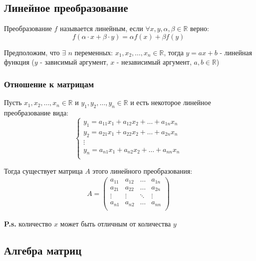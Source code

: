 \documentclass[class=article,a4paper,12pt,crop=false]{standalone}
\begin{document}
\subsection{Линейное преобразование}

Преобразование $f$ называется линейным, если $\forall x, y, \alpha, \beta \in \mathbb{R}$ верно:
\begin{equation}
    f(\alpha\cdot x + \beta\cdot y) = \alpha f(x) + \beta f(y)
\end{equation}

Предположим, что $\exists$ $n$ переменных: $x_1, x_2, \dots, x_n \in \mathbb{R}$, тогда
$y = ax + b$ - линейная функция ($y$ - зависимый аргумент,  $x$ - независимый аргумент,
$a, b \in \mathbb{R}$)

\subsubsection{Отношение к матрицам}

Пусть $x_1, x_2, \dots, x_n \in \mathbb{R}$ и $y_1, y_2, \dots, y_n \in \mathbb{R}$ и есть некоторое
линейное преобразование вида:
\begin{equation}
    \begin{cases}
        y_1 = a_{11}x_1 + a_{12}x_2 + \dots + a_{1n}x_n\\
        y_2 = a_{21}x_1 + a_{22}x_2 + \dots + a_{2n}x_n\\
        \vdots \\
        y_n = a_{n1}x_1 + a_{n2}x_2 + \dots + a_{nn}x_n\\
    \end{cases}
\end{equation}

Тогда существует матрица $A$ этого линейного преобразования:
\begin{eqnarray}
    A = \begin{pmatrix}
        a_{11} & a_{12} & \dots & a_{1n} \\
        a_{21} & a_{22} & \dots & a_{2n} \\
        \vdots & \vdots & \ddots & \vdots \\
        a_{n1} & a_{n2} & \dots & a_{nn} \\
    \end{pmatrix}
\end{eqnarray}

\textbf{P.s.} количество $x$ может быть отличным от количества $y$

\subsection{Алгебра матриц}
\end{document}
